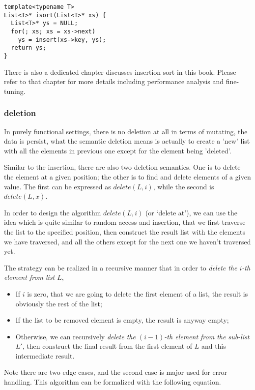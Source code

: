 \documentclass[b5paper]{article}
\begin{document}
\lstset{language=C++}
\begin{lstlisting}
template<typename T>
List<T>* isort(List<T>* xs) {
  List<T>* ys = NULL;
  for(; xs; xs = xs->next)
    ys = insert(xs->key, ys);
  return ys;
}
\end{lstlisting}

There is also a dedicated chapter discusses insertion sort in this book. Please refer to that chapter for
more details including performance analysis and fine-tuning.

\subsubsection{deletion}
In purely functional settings, there is no deletion at all in terms of mutating, the data is persist, what
the semantic deletion means is actually to create a 'new' list with all the elements in previous one except for
the element being 'deleted'.

Similar to the insertion, there are also two deletion semantics. One is to delete the element at a given position;
the other is to find and delete elements of a given value. The first can be expressed as $delete(L, i)$, while
the second is $delete(L, x)$.

In order to design the algorithm $delete(L,i)$ (or `delete at'), we can use the idea which is quite similar to
random access and insertion, that we first traverse the list to the specified position, then construct the
result list with the elements we have traversed, and all the others except for the next one we haven't traversed yet.

The strategy can be realized in a recursive manner that in order to {\em delete the $i$-th element from list $L$},
\begin{itemize}
\item If $i$ is zero, that we are going to delete the first element of a list, the result is obviously the rest of the list;
\item If the list to be removed element is empty, the result is anyway empty;
\item Otherwise, we can recursively {\em delete the $(i-1)$-th element from the sub-list $L'$}, then construct the final
result from the first element of $L$ and this intermediate result.
\end{itemize}

Note there are two edge cases, and the second case is major used for error handling. This algorithm can be formalized
with the following equation.
\end{document}
